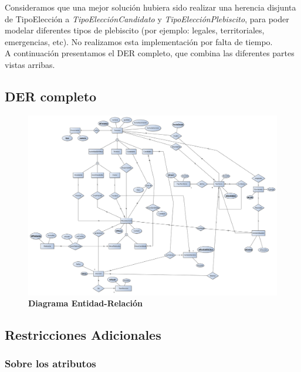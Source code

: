 Consideramos que una mejor solución hubiera sido realizar una herencia disjunta de TipoElección a \textit{TipoElecciónCandidato} y \textit{TipoElecciónPlebiscito}, para poder modelar diferentes tipos de plebiscito (por ejemplo: legales, territoriales, emergencias, etc). No realizamos esta implementación por falta de tiempo.\\

A continuación presentamos el DER completo, que combina las diferentes partes vistas arribas.

\subsection{DER completo}
\begin{figure}[H]
   \begin{center}
   \includegraphics[angle=90,scale=0.32]{graphics/der.png}
   \caption{\textbf{Diagrama Entidad-Relación}}
   \label{fig:der}
   \end{center}
\end{figure}

\subsection{Restricciones Adicionales}

\subsubsection{Sobre los atributos}

